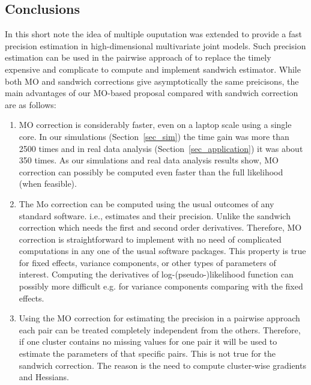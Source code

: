 \documentclass[11pt,a5paper,twoside]{book}
\begin{document}
{}


 
\subsection{Conclusions}
\label{sec_conclusions}

In this short note the idea of multiple ouputation was extended to provide a fast precision estimation in high-dimensional multivariate joint models. Such precision estimation can be used in the pairwise approach of \cite{Verbeke2006, Verbeke2007} to replace the timely expensive and complicate to compute and implement sandwich estimator. While both MO and sandwich corrections give asymptotically the same preicisons, the main advantages of our MO-based proposal compared with sandwich correction are as follows:
\begin{enumerate}
\item MO correction is considerably faster, even on a laptop scale using a single core. In our simulations (Section~\ref{sec_sim}) the time gain was more than 2500 times and in real data analysis (Section~\ref{sec_application}) it was about 350 times. As our simulations and real data analysis results show, MO correction can possibly be computed even faster than the full likelihood (when feasible).
\item The Mo correction can be computed using the usual outcomes of any standard software. i.e., estimates and their precision. Unlike the sandwich correction which needs the first and second order derivatives. Therefore, MO correction is straightforward to implement with no need of complicated computations in any one of the usual software packages. This property is true for fixed effects, variance components, or other types of parameters of interest. Computing the derivatives of log-(pseudo-)likelihood function can possibly more difficult e.g. for variance components comparing with the fixed effects.
\item Using the MO correction for estimating the precision in a pairwise approach \citep{Verbeke2006, Verbeke2007} each pair can be treated completely independent from the others. Therefore, if one cluster contains no missing values for one pair it will be used to estimate the parameters of that specific pairs. This is not true for the sandwich correction. The reason is the need to compute cluster-wise gradients and Hessians. 
\end{enumerate}
\end{document}
